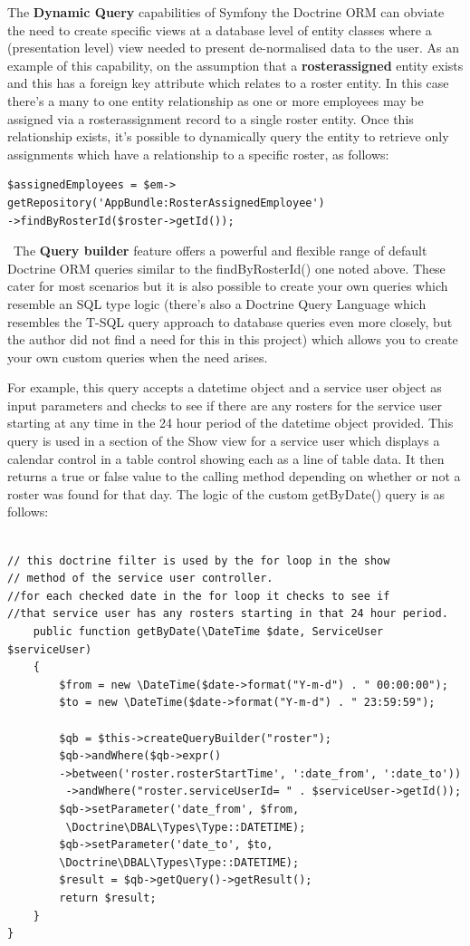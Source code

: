 \documentclass[a4paper,12pt]{article}
\begin{document}
The \textbf{Dynamic Query} capabilities of Symfony the Doctrine ORM can obviate the need to create specific views at a database level of entity classes where a (presentation level) view needed to present de-normalised data to the user. As an example of this capability, on the assumption that a \textbf{rosterassigned} entity exists and this has a foreign key attribute which relates to a roster entity. In this case there's a many to one entity relationship as one or more employees may be assigned via a rosterassignment record to a single roster entity. Once this relationship exists, it's possible to dynamically query the entity to retrieve only assignments which have a relationship to a specific roster, as follows:

\begin{verbatim}$assignedEmployees = $em->
getRepository('AppBundle:RosterAssignedEmployee')
->findByRosterId($roster->getId());
\end{verbatim}
\
The \textbf{Query builder} feature offers a powerful and flexible range of default Doctrine ORM queries similar to the findByRosterId() one noted above. These cater for most scenarios but it is also possible to create your own queries which resemble an SQL type logic (there's also a Doctrine Query Language which resembles the T-SQL query approach to database queries even more closely, but the author did not find a need for this in this project) which allows you to create your own custom queries when the need arises. 

For example, this query accepts a datetime object and a service user object as input parameters and checks to see if there are any rosters for the service user starting at any time in the 24 hour period of the datetime object provided. This query is used in a section of the Show view for a service user which displays a calendar control in a table control showing each as a line of table data. It then returns a true or false value to the calling method depending on whether or not a roster was found for that day.
The logic of the custom getByDate() query is as follows:
\begin{verbatim}
     
// this doctrine filter is used by the for loop in the show
// method of the service user controller.
//for each checked date in the for loop it checks to see if 
//that service user has any rosters starting in that 24 hour period.
    public function getByDate(\DateTime $date, ServiceUser $serviceUser)
    {
        $from = new \DateTime($date->format("Y-m-d") . " 00:00:00");
        $to = new \DateTime($date->format("Y-m-d") . " 23:59:59");
       
        $qb = $this->createQueryBuilder("roster");
        $qb->andWhere($qb->expr()
        ->between('roster.rosterStartTime', ':date_from', ':date_to'))
         ->andWhere("roster.serviceUserId= " . $serviceUser->getId());
        $qb->setParameter('date_from', $from,
         \Doctrine\DBAL\Types\Type::DATETIME);
        $qb->setParameter('date_to', $to, 
        \Doctrine\DBAL\Types\Type::DATETIME);
        $result = $qb->getQuery()->getResult();
        return $result;
    }
}  
\end{verbatim}
\end{document}

